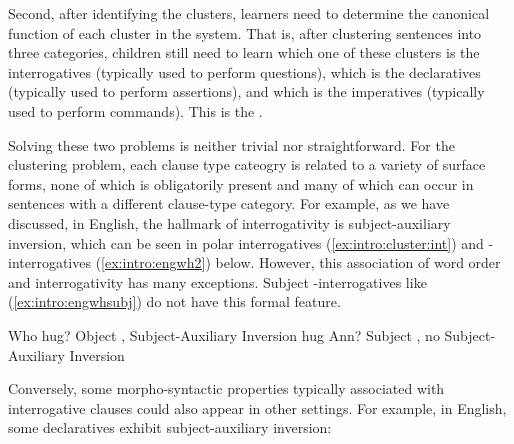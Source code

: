 Second, after identifying the clusters, learners need to determine the canonical function of each cluster in the system. That is, after clustering sentences into three categories, children still need to learn which one of these clusters is the interrogatives (typically used to perform questions), which is the declaratives (typically used to perform assertions), and which is the imperatives (typically used to perform commands). This is the . %


Solving these two problems is neither trivial nor straightforward. For the clustering problem, each clause type cateogry is related to a variety of surface forms, none of which is obligatorily present and many of which can occur in sentences with a different clause-type category. For example, as we have discussed, in English, the hallmark of interrogativity is subject-auxiliary inversion, which can be seen in polar interrogatives (\ref{ex:intro:cluster:int}) and \twh-interrogatives (\ref{ex:intro:engwh2}) below. However, this association of word order and interrogativity has many exceptions. Subject \twh-interrogatives like (\ref{ex:intro:engwhsubj}) do not have this formal feature.


Who   hug? \hfill Object \twh{}, Subject-Auxiliary Inversion
\eex
{}
  hug Ann? \hfill Subject \twh{}, no Subject-Auxiliary Inversion
\eex

Conversely, some morpho-syntactic properties typically associated with interrogative clauses could also appear in other settings. For example, in English, some declaratives exhibit subject-auxiliary inversion: 

